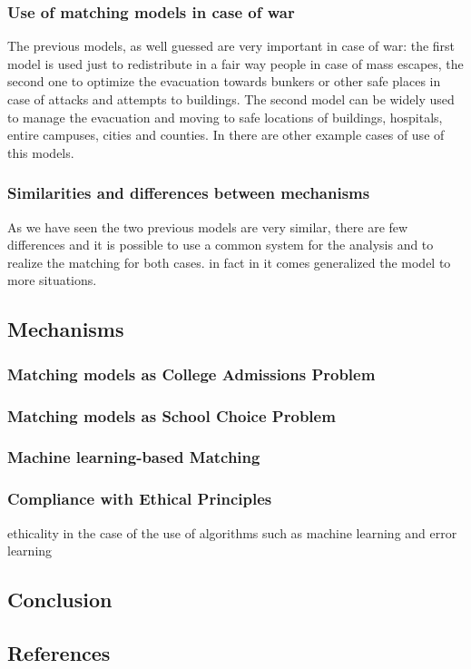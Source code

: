 \documentclass[letterpaper]{article} %
\begin{document}
\subsubsection{Use of matching models in case of war}

The previous models, as well guessed are very important in case of war: the first model is used just 
to redistribute in a fair way people in case of mass escapes, the second one to optimize the evacuation 
towards bunkers or other safe places in case of attacks and attempts to buildings.
The second model can be widely used to manage the evacuation and moving to safe locations of buildings, hospitals, entire campuses, cities and counties.
In \cite{delacretaz_2020,delacretaz_2019,delacretaz_2016}   there are other example cases of use of this models.

\subsubsection{Similarities and differences between mechanisms}

As we have seen the two previous models are very similar, there are few differences and it is possible to use a common system for the analysis and to realize the matching for both cases.
in fact in \cite{delacretaz_2020} it comes generalized the model to more situations.

\subsection{Mechanisms}


\subsubsection{Matching models as College Admissions Problem}



\cite{basshuysen} 

\subsubsection{Matching models as School Choice Problem}

\cite{basshuysen} 

\subsubsection{Machine learning-based Matching}

\cite{olbergml}

\subsubsection{Compliance with Ethical Principles}

\cite{basshuysen} 

ethicality in the case of the use of algorithms such as machine learning and error learning 

\subsection{Conclusion}

\subsection{References}



\end{document}
